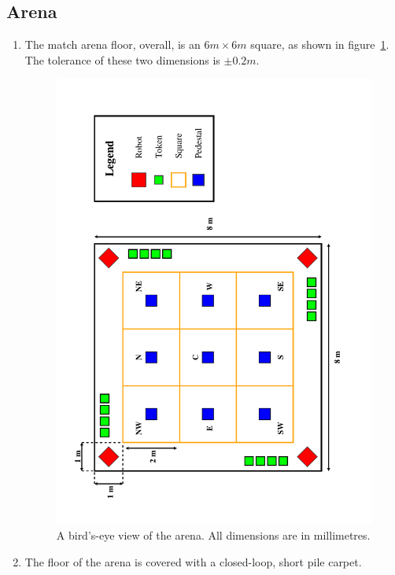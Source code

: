 \subsection{Arena}
\label{sub:arena}
\begin{enumerate}
\item The match arena floor, overall, is an $6m \times 6m$ square, as shown in figure~\ref{fig:arena-dim}.
      The tolerance of these two dimensions is $\pm0.2m$.

\begin{figure}
  \centering
  \includegraphics[width=\textwidth]{./images/arena.pdf}
  \caption{\label{fig:arena-dim}A bird's-eye view of the arena. All dimensions are in millimetres.}
\end{figure}

\item The floor of the arena is covered with a closed-loop, short pile carpet.


\end{enumerate}
